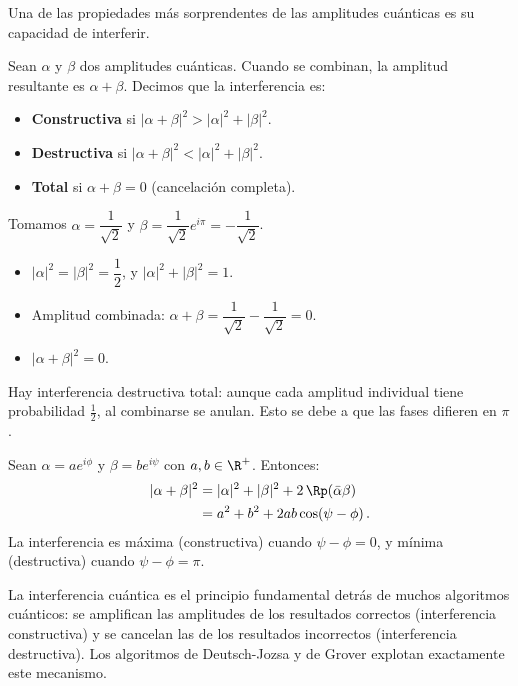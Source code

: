 Una de las propiedades más sorprendentes de las amplitudes cuánticas es su capacidad de interferir.

\begin{defi}[Interferencia]
  Sean $\alpha$ y $\beta$ dos amplitudes cuánticas. Cuando se combinan, la amplitud resultante es $\alpha+\beta$. Decimos que la interferencia es:
  \begin{itemize}
    \item \textbf{Constructiva} si $|\alpha+\beta|^2 > |\alpha|^2 + |\beta|^2$.
    \item \textbf{Destructiva} si $|\alpha+\beta|^2 < |\alpha|^2 + |\beta|^2$.
    \item \textbf{Total} si $\alpha+\beta = 0$ (cancelación completa).
  \end{itemize}
\end{defi}

\begin{eje}
  Tomamos $\alpha = \dfrac{1}{\sqrt{2}}$ y $\beta = \dfrac{1}{\sqrt{2}}e^{i\pi}= -\dfrac{1}{\sqrt{2}}$.
  \begin{itemize}
    \item $|\alpha|^2 = |\beta|^2 = \dfrac{1}{2}$, y $|\alpha|^2 + |\beta|^2 = 1$.
    \item Amplitud combinada: $\alpha + \beta = \dfrac{1}{\sqrt{2}} - \dfrac{1}{\sqrt{2}} = 0$.
    \item $|\alpha + \beta|^2 = 0$.
  \end{itemize}
  Hay interferencia destructiva total: aunque cada amplitud individual tiene probabilidad $\frac{1}{2}$, al combinarse se anulan. Esto se debe a que las fases difieren en $\pi$.
\end{eje}

\begin{eje}
  Sean $\alpha = ae^{i\phi}$ y $\beta = be^{i\psi}$ con $a,b\in\R^+$. Entonces:
  \begin{align*}
    |\alpha+\beta|^2 & = |\alpha|^2 + |\beta|^2 + 2\,\Rp(\bar\alpha\beta) \\
                     & = a^2 + b^2 + 2ab\cos(\psi-\phi)\,.
  \end{align*}
  La interferencia es máxima (constructiva) cuando $\psi-\phi=0$, y mínima (destructiva) cuando $\psi-\phi=\pi$.
\end{eje}

\begin{info}
  La interferencia cuántica es el principio fundamental detrás de muchos algoritmos cuánticos: se amplifican las amplitudes de los resultados correctos (interferencia constructiva) y se cancelan las de los resultados incorrectos (interferencia destructiva). Los algoritmos de Deutsch-Jozsa y de Grover explotan exactamente este mecanismo.
\end{info}